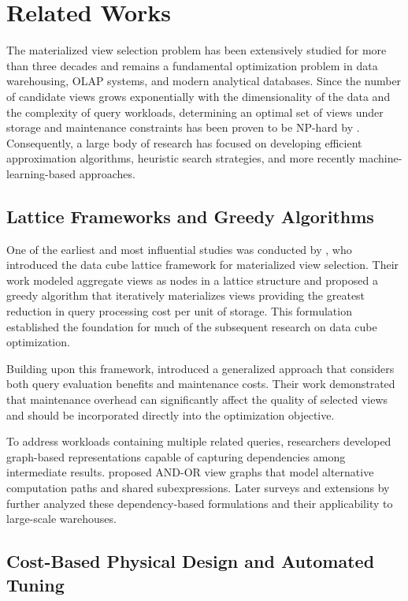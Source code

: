 \section{Related Works}

The materialized view selection problem has been extensively studied for more than three decades and remains a fundamental optimization problem in data warehousing, OLAP systems, and modern analytical databases. Since the number of candidate views grows exponentially with the dimensionality of the data and the complexity of query workloads, determining an optimal set of views under storage and maintenance constraints has been proven to be NP-hard by \textcite{Gupta_1997}. Consequently, a large body of research has focused on developing efficient approximation algorithms, heuristic search strategies, and more recently machine-learning-based approaches.

\subsection{Lattice Frameworks and Greedy Algorithms}

One of the earliest and most influential studies was conducted by \textcite{Harinarayan_1996}, who introduced the data cube lattice framework for materialized view selection. Their work modeled aggregate views as nodes in a lattice structure and proposed a greedy algorithm that iteratively materializes views providing the greatest reduction in query processing cost per unit of storage. This formulation established the foundation for much of the subsequent research on data cube optimization.

Building upon this framework, \textcite{Gupta_1997} introduced a generalized approach that considers both query evaluation benefits and maintenance costs. Their work demonstrated that maintenance overhead can significantly affect the quality of selected views and should be incorporated directly into the optimization objective.

To address workloads containing multiple related queries, researchers developed graph-based representations capable of capturing dependencies among intermediate results. \textcite{Yang_1997} proposed AND-OR view graphs that model alternative computation paths and shared subexpressions. Later surveys and extensions by \textcite{Chirkova_2012} further analyzed these dependency-based formulations and their applicability to large-scale warehouses.

\subsection{Cost-Based Physical Design and Automated Tuning}

